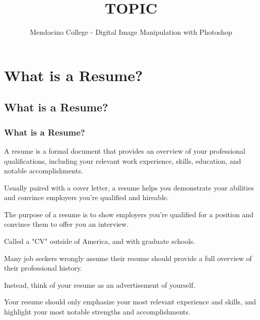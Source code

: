 \documentclass{beamer}
\title{TOPIC}
\author{Mendocino College - Digital Image Manipulation with Photoshop}
\date{\vspace{-5em}}
\begin{document}
	{
		\begin{frame}
			\vspace{-35pt}
			\maketitle
		\end{frame}
	}
		
		
\section{What is a Resume?}

\subsection{What is a Resume?}		

	\begin{frame}
		\frametitle{What is a Resume?}
		\begin{outline}
			\1 A resume is a formal document that provides an overview of your professional qualifications, including your relevant work experience, skills, education, and notable accomplishments. 
			
			\1 Usually paired with a cover letter, a resume helps you demonstrate your abilities and convince employers you’re qualified and hireable.
			
			\1 The purpose of a resume is to show employers you’re qualified for a position and convince them to offer you an interview.
			
			\2 Called a "CV" outside of America, and with graduate schools.
			
			\1 Many job seekers wrongly assume their resume should provide a full overview of their professional history.
			
			\2 Instead, think of your resume as an advertisement of yourself. 
			
			\1 Your resume should only emphasize your most relevant experience and skills, and highlight your most notable strengths and accomplishments.
		\end{outline}
	\end{frame}
\end{document}
